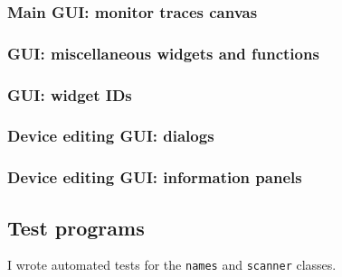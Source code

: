 \documentclass[landscape,twocolumn,a4paper,10pt]{article}
\begin{document}
\subsubsection{Main GUI: monitor traces canvas}


\subsubsection{GUI: miscellaneous widgets and functions}


\subsubsection{GUI: widget IDs}

\subsubsection{Device editing GUI: dialogs}


\subsubsection{Device editing GUI: information panels}



\clearpage
\subsection{Test programs}
I wrote automated tests for the \texttt{names} and \texttt{scanner} classes. 






\end{document}
